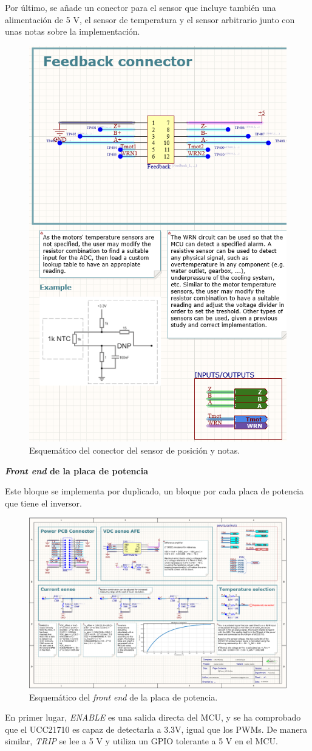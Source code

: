 Por último, se añade un conector para el sensor que incluye también una alimentación de 5 V, el sensor de temperatura y el sensor arbitrario junto con unas notas sobre la implementación.
\begin{figure}[H]
	\centering
	\includegraphics[width=0.5\linewidth]{fig/schFDBcontrol}
	\caption{Esquemático del conector del sensor de posición y notas.}
\end{figure}

\textbf{\textit{Front end} de la placa de potencia}

Este bloque se implementa por duplicado, un bloque por cada placa de potencia que tiene el inversor.

\begin{figure}[H]
	\centering
	\includegraphics[width=0.7\linewidth]{fig/schPOWERAFEcontrol}
	\caption{Esquemático del \textit{front end} de la placa de potencia.}
\end{figure}


En primer lugar, \textit{ENABLE} es una salida directa del MCU, y se ha comprobado que el UCC21710 es capaz de detectarla a 3.3V, igual que los PWMs. De manera similar, \textit{TRIP} se lee a 5 V y utiliza un GPIO tolerante a 5 V en el MCU.

